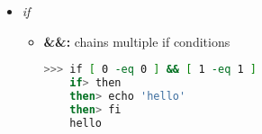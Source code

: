\documentclass[12pt]{article}
\begin{document}
\begin{itemize}
\begin{itemize}
    \end{itemize}

    \item \textit{if}

    \begin{itemize}
    \item \textbf{\&\&:} chains multiple if conditions

    \begin{lstlisting}[language=bash]
    >>> if [ 0 -eq 0 ] && [ 1 -eq 1 ]
    if> then
    then> echo 'hello'
    then> fi
    hello
    \end{lstlisting}
    \end{itemize}

\end{itemize}
\end{document}
